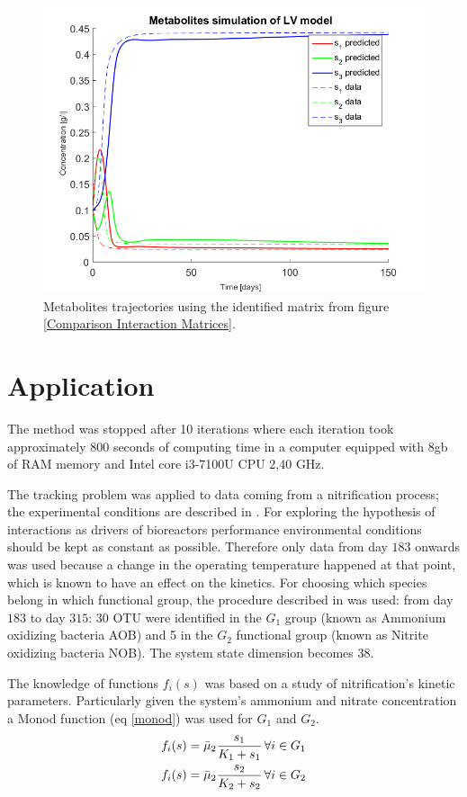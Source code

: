 \documentclass[3p,times]{elsarticle}
\begin{document}
\begin{figure}
	\centering
	\includegraphics[width=0.5 \textwidth]{Synthetic_data_no_noise//221119_no_noise_iter_5_metabolites_Iter_5_LV}
	\caption{Metabolites trajectories using the identified matrix from figure \eqref{Comparison Interaction Matrices}.}
	\label{Metabolites LV simulation}
\end{figure}


\clearpage
\section{Application}
 
The method was stopped after 10 iterations where each iteration took approximately 800 seconds of computing time in a computer equipped with 8gb of RAM memory and Intel core i3-7100U CPU 2,40 GHz.

The tracking problem was applied to data coming from a nitrification process; the experimental conditions are described in \cite{dumont2008observers}. For exploring the hypothesis of interactions as drivers of bioreactors performance environmental conditions should be kept as constant as possible. Therefore only data from day $183$ onwards was used because a change in the operating temperature happened at that point, which is known to have an effect on the kinetics. For choosing which species belong in which functional group, the procedure described in \cite{Ugalde-Salas2019} was used: from day $183$ to day $315$: 30 OTU were identified in the $G_1$ group (known as Ammonium oxidizing bacteria AOB) and 5 in the $G_2$ functional group (known as Nitrite oxidizing bacteria NOB). The system state dimension becomes 38.

The knowledge of functions $f_i(s)$ was based on a study of nitrification's kinetic parameters\cite{Wiesmann1994}. Particularly given the system's ammonium and nitrate concentration a Monod function (eq \eqref{monod}) was used for $G_1$ and $G_2$. 
\begin{align}
\label{monod} f_i(s) &= \bar{\mu}_2 \dfrac{s_1}{K_1 +s_1} \, \forall i \in G_1 \\
\notag  f_i(s) &= \bar{\mu}_2 \dfrac{s_2}{K_2 +s_2 } \, \forall i \in G_2
\end{align}
\end{document}
